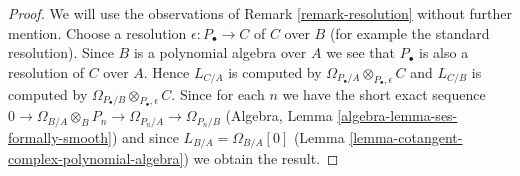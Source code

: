 \begin{proof}
We will use the observations of Remark \ref{remark-resolution}
without further mention. Choose a resolution $\epsilon : P_\bullet \to C$
of $C$ over $B$ (for example the standard resolution). Since $B$ is a
polynomial algebra over $A$ we see that $P_\bullet$ is also a resolution of
$C$ over $A$. Hence $L_{C/A}$ is computed by
$\Omega_{P_\bullet/A} \otimes_{P_\bullet, \epsilon} C$
and $L_{C/B}$ is computed by
$\Omega_{P_\bullet/B} \otimes_{P_\bullet, \epsilon} C$.
Since for each $n$ we have the short exact sequence
$0 \to \Omega_{B/A} \otimes_B P_n \to \Omega_{P_n/A} \to \Omega_{P_n/B}$
(Algebra, Lemma \ref{algebra-lemma-ses-formally-smooth})
and since $L_{B/A} = \Omega_{B/A}[0]$
(Lemma \ref{lemma-cotangent-complex-polynomial-algebra})
we obtain the result.
\end{proof}

